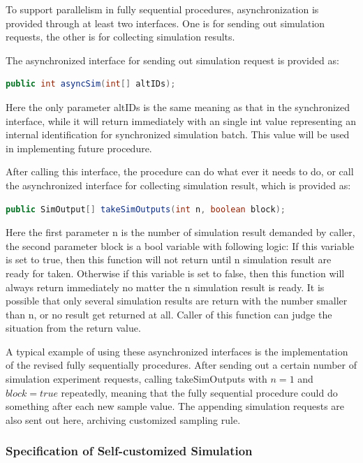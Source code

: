 \documentclass[12pt,a4paper]{report}
\begin{document}
To support parallelism in fully sequential procedures, asynchronization is provided through at least two interfaces. One is for sending out simulation requests, the other is for collecting simulation results.

The asynchronized interface for sending out simulation request is provided as:

\begin{lstlisting}[language=Java]
public int asyncSim(int[] altIDs);
\end{lstlisting}

Here the only parameter altIDs is the same meaning as that in the synchronized interface, while it will return immediately with an single int value representing an internal identification for synchronized simulation batch. This value will be used in implementing future procedure.

After calling this interface, the procedure can do what ever it needs to do, or call the asynchronized interface for collecting simulation result, which is provided as:

\begin{lstlisting}[language=Java]
public SimOutput[] takeSimOutputs(int n, boolean block);
\end{lstlisting}

Here the first parameter n is the number of simulation result demanded by caller, the second parameter block is a bool variable with following logic: If this variable is set to true, then this function will not return until n simulation result are ready for taken. Otherwise if this variable  is set to false, then this function will always return immediately no matter the n simulation result is ready. It is possible that only several simulation results are return with the number smaller than n, or no result get returned at all. Caller of this function can judge the situation from the return value.

A typical example of using these asynchronized interfaces is the implementation of the revised fully sequentially procedures. After sending out a certain number of simulation experiment requests, calling takeSimOutputs with $n = 1$ and $block = true$ repeatedly, meaning that the fully sequential procedure could do something after each new sample value. The appending simulation requests are also sent out here, archiving customized sampling rule.

\subsubsection{Specification of Self-customized Simulation}
\end{document}

